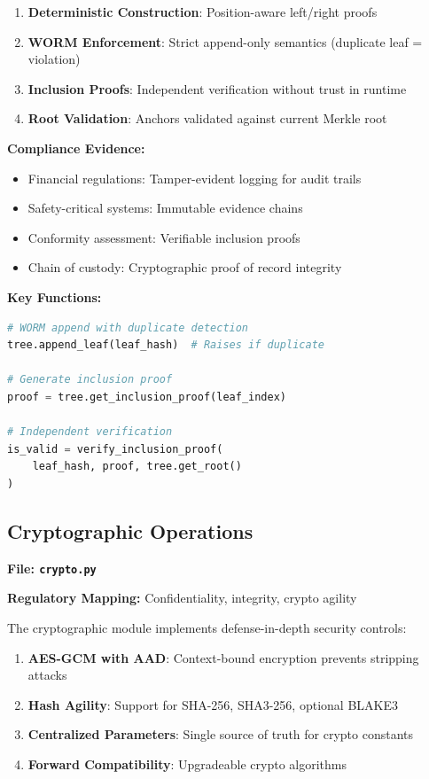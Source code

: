 \documentclass[11pt,a4paper]{article}
\begin{document}
\begin{enumerate}
    \item \textbf{Deterministic Construction}: Position-aware left/right proofs
    \item \textbf{WORM Enforcement}: Strict append-only semantics (duplicate leaf = violation)
    \item \textbf{Inclusion Proofs}: Independent verification without trust in runtime
    \item \textbf{Root Validation}: Anchors validated against current Merkle root
\end{enumerate}

\textbf{Compliance Evidence:}
\begin{itemize}
    \item Financial regulations: Tamper-evident logging for audit trails
    \item Safety-critical systems: Immutable evidence chains
    \item Conformity assessment: Verifiable inclusion proofs
    \item Chain of custody: Cryptographic proof of record integrity
\end{itemize}

\textbf{Key Functions:}
\begin{lstlisting}[language=Python]
# WORM append with duplicate detection
tree.append_leaf(leaf_hash)  # Raises if duplicate

# Generate inclusion proof
proof = tree.get_inclusion_proof(leaf_index)

# Independent verification
is_valid = verify_inclusion_proof(
    leaf_hash, proof, tree.get_root()
)
\end{lstlisting}

\subsection{Cryptographic Operations}
\textbf{File: \texttt{crypto.py}}

\textbf{Regulatory Mapping:} Confidentiality, integrity, crypto agility

The cryptographic module implements defense-in-depth security controls:

\begin{enumerate}
    \item \textbf{AES-GCM with AAD}: Context-bound encryption prevents stripping attacks
    \item \textbf{Hash Agility}: Support for SHA-256, SHA3-256, optional BLAKE3
    \item \textbf{Centralized Parameters}: Single source of truth for crypto constants
    \item \textbf{Forward Compatibility}: Upgradeable crypto algorithms
\end{enumerate}
\end{document}
